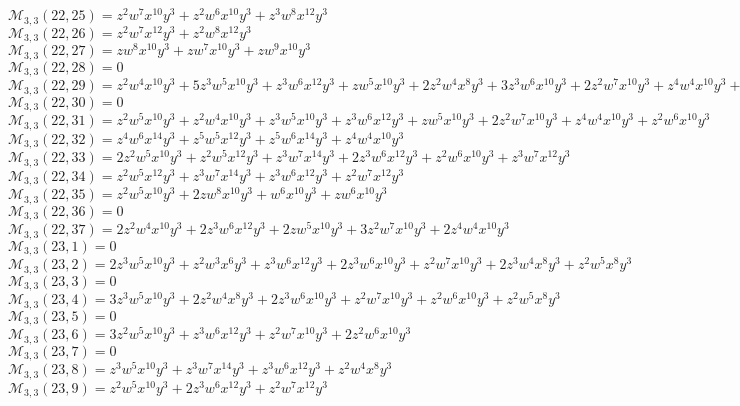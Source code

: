 \documentclass[12pt]{memoireuqam1.3}
\begin{document}
$\mathcal{M}_{3,3}(22,25)=z^2w^7x^{10}y^3+z^2w^6x^{10}y^3+z^3w^8x^{12}y^3$\\
$\mathcal{M}_{3,3}(22,26)=z^2w^7x^{12}y^3+z^2w^8x^{12}y^3$\\
$\mathcal{M}_{3,3}(22,27)=zw^8x^{10}y^3+zw^7x^{10}y^3+zw^9x^{10}y^3$\\
$\mathcal{M}_{3,3}(22,28)=0$\\
$\mathcal{M}_{3,3}(22,29)=z^2w^4x^{10}y^3+5z^3w^5x^{10}y^3+z^3w^6x^{12}y^3+zw^5x^{10}y^3+2z^2w^4x^8y^3+3z^3w^6x^{10}y^3+2z^2w^7x^{10}y^3+z^4w^4x^{10}y^3+z^2w^5x^8y^3$\\
$\mathcal{M}_{3,3}(22,30)=0$\\
$\mathcal{M}_{3,3}(22,31)=z^2w^5x^{10}y^3+z^2w^4x^{10}y^3+z^3w^5x^{10}y^3+z^3w^6x^{12}y^3+zw^5x^{10}y^3+2z^2w^7x^{10}y^3+z^4w^4x^{10}y^3+z^2w^6x^{10}y^3$\\
$\mathcal{M}_{3,3}(22,32)=z^4w^6x^{14}y^3+z^5w^5x^{12}y^3+z^5w^6x^{14}y^3+z^4w^4x^{10}y^3$\\
$\mathcal{M}_{3,3}(22,33)=2z^2w^5x^{10}y^3+z^2w^5x^{12}y^3+z^3w^7x^{14}y^3+2z^3w^6x^{12}y^3+z^2w^6x^{10}y^3+z^3w^7x^{12}y^3$\\
$\mathcal{M}_{3,3}(22,34)=z^2w^5x^{12}y^3+z^3w^7x^{14}y^3+z^3w^6x^{12}y^3+z^2w^7x^{12}y^3$\\
$\mathcal{M}_{3,3}(22,35)=z^2w^5x^{10}y^3+2zw^8x^{10}y^3+w^6x^{10}y^3+zw^6x^{10}y^3$\\
$\mathcal{M}_{3,3}(22,36)=0$\\
$\mathcal{M}_{3,3}(22,37)=2z^2w^4x^{10}y^3+2z^3w^6x^{12}y^3+2zw^5x^{10}y^3+3z^2w^7x^{10}y^3+2z^4w^4x^{10}y^3$\\
$\mathcal{M}_{3,3}(23,1)=0$\\
$\mathcal{M}_{3,3}(23,2)=2z^3w^5x^{10}y^3+z^2w^3x^6y^3+z^3w^6x^{12}y^3+2z^3w^6x^{10}y^3+z^2w^7x^{10}y^3+2z^3w^4x^8y^3+z^2w^5x^8y^3$\\
$\mathcal{M}_{3,3}(23,3)=0$\\
$\mathcal{M}_{3,3}(23,4)=3z^3w^5x^{10}y^3+2z^2w^4x^8y^3+2z^3w^6x^{10}y^3+z^2w^7x^{10}y^3+z^2w^6x^{10}y^3+z^2w^5x^8y^3$\\
$\mathcal{M}_{3,3}(23,5)=0$\\
$\mathcal{M}_{3,3}(23,6)=3z^2w^5x^{10}y^3+z^3w^6x^{12}y^3+z^2w^7x^{10}y^3+2z^2w^6x^{10}y^3$\\
$\mathcal{M}_{3,3}(23,7)=0$\\
$\mathcal{M}_{3,3}(23,8)=z^3w^5x^{10}y^3+z^3w^7x^{14}y^3+z^3w^6x^{12}y^3+z^2w^4x^8y^3$\\
$\mathcal{M}_{3,3}(23,9)=z^2w^5x^{10}y^3+2z^3w^6x^{12}y^3+z^2w^7x^{12}y^3$\\
\end{document}
